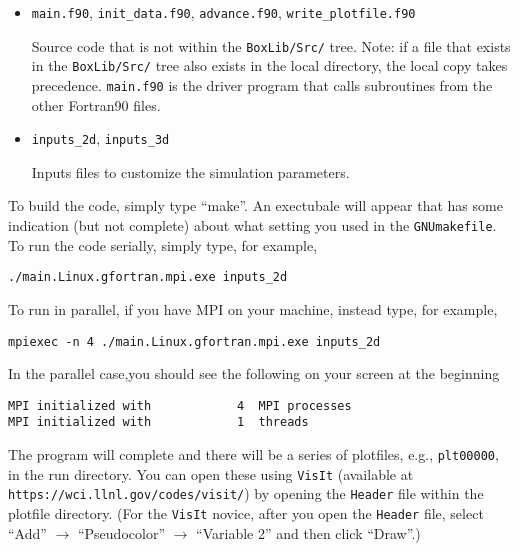 \begin{itemize}
\item {\tt main.f90}, {\tt init\_data.f90}, {\tt advance.f90}, {\tt write\_plotfile.f90}

Source code that is not within the {\tt BoxLib/Src/} tree.  Note: if a file that exists in the
{\tt BoxLib/Src/} tree also exists in the local directory, the local copy takes precedence.
{\tt main.f90} is the driver program that calls subroutines from the other Fortran90 files.

\item {\tt inputs\_2d}, {\tt inputs\_3d}

Inputs files to customize the simulation parameters.

\end{itemize}

To build the code, simply type ``make''.  An exectubale will appear that has some indication (but not complete)
about what setting you used in the {\tt GNUmakefile}.  To run the code serially, simply type, for example,
\begin{verbatim}
./main.Linux.gfortran.mpi.exe inputs_2d
\end{verbatim}
To run in parallel, if you have MPI on your machine, instead type, for example,
\begin{verbatim}
mpiexec -n 4 ./main.Linux.gfortran.mpi.exe inputs_2d
\end{verbatim}
In the parallel case,you should see the following on your screen at the beginning
\begin{verbatim}
MPI initialized with            4  MPI processes
MPI initialized with            1  threads
\end{verbatim}
The program will complete and there will be a series of plotfiles, e.g., {\tt plt00000}, in the run directory.
You can open these using {\tt VisIt} (available at {\tt https://wci.llnl.gov/codes/visit/}) by opening
the {\tt Header} file within the plotfile directory.  (For the {\tt VisIt} novice, after you open the {\tt Header}
file, select ``Add'' $\rightarrow$ ``Pseudocolor'' $\rightarrow$ ``Variable 2'' and then click ``Draw''.)
